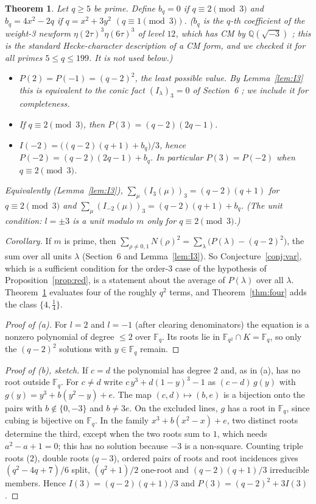 \documentclass[11pt]{article}
\newtheorem{theorem}{Theorem}
\begin{document}
\begin{theorem}\label{thm:gal}
Let $q\ge5$ be prime. Define $b_q=0$ if $q\equiv2\pmod3$ and $b_q=4x^2-2q$ if $q=x^2+3y^2$ $(q\equiv1\pmod3)$.
($b_q$ is the $q$-th coefficient of the weight-3 newform $\eta(2\tau)^3\eta(6\tau)^3$ of level $12$, which has CM by $\mathbb Q(\sqrt{-3})$ \cite{LM}; this is the standard
Hecke-character description of a CM form, and we checked it for all primes $5\le q\le199$. It is not used below.)
\begin{itemize}
\item[(a)] $P(2)=P(-1)=(q-2)^2$, the least possible value. By Lemma~\ref{lem:I3} this is equivalent to the conic fact $(I_\lambda)_3=0$ of Section~6 \cite{JV,Pi}; we include it for completeness.
\item[(b)] If $q\equiv2\pmod3$, then $P(3)=(q-2)(2q-1)$.
\item[(c)] $I(-2)=\big((q-2)(q+1)+b_q\big)/3$, hence $P(-2)=(q-2)(2q-1)+b_q$. In particular $P(3)=P(-2)$ when $q\equiv2\pmod3$.
\end{itemize}
Equivalently (Lemma~\ref{lem:I3}), $\sum_\mu(I_3(\mu))_3=(q-2)(q+1)$ for $q\equiv2\pmod3$ and $\sum_\mu(I_{-2}(\mu))_3=(q-2)(q+1)+b_q$. (The unit condition: $l=\pm3$ is a unit modulo $m$ only for $q\equiv2\pmod3$.)
\end{theorem}
\noindent\emph{Corollary.} If $m$ is prime, then $\sum_{\rho\ne0,1}N(\rho)^2=\sum_{\lambda}\bigl(P(\lambda)-(q-2)^2\bigr)$, the sum over all units $\lambda$ (Section~6 and Lemma~\ref{lem:I3}).
So Conjecture~\ref{conj:var}, which is a sufficient condition for the order-3 case of the hypothesis of Proposition~\ref{prop:red}, is a statement about the average of $P(\lambda)$ over all $\lambda$.
Theorem~\ref{thm:gal} evaluates four of the roughly $q^2$ terms, and Theorem~\ref{thm:four} adds the class $\{4,\tfrac14\}$.

\begin{proof}[Proof of (a)]
For $l=2$ and $l=-1$ (after clearing denominators) the equation is a nonzero polynomial of degree $\le2$ over $\mathbb F_q$. Its roots lie in
$\mathbb F_{q^2}\cap K=\mathbb F_q$, so only the $(q-2)^2$ solutions with $y\in\mathbb F_q$ remain.
\end{proof}

\begin{proof}[Proof of (b), sketch]
If $c=d$ the polynomial has degree $2$ and, as in (a), has no root outside $\mathbb F_q$. For $c\ne d$ write $c\,y^3+d(1-y)^3-1$ as $(c-d)\,g(y)$ with $g(y)=y^3+b(y^2-y)+e$. The map $(c,d)\mapsto(b,e)$ is a bijection onto the pairs with
$b\notin\{0,-3\}$ and $b\ne3e$. On the excluded lines, $g$ has a root in $\mathbb F_q$, since cubing is bijective on $\mathbb F_q$. In the family
$x^3+b(x^2-x)+e$, two distinct roots determine the third, except when the two roots sum to $1$, which needs $a^2-a+1=0$; this has no solution because
$-3$ is a non-square. Counting triple roots ($2$), double roots ($q-3$), ordered pairs of roots and root incidences gives
$(q^2-4q+7)/6$ split, $(q^2+1)/2$ one-root and $(q-2)(q+1)/3$ irreducible members. Hence $I(3)=(q-2)(q+1)/3$ and $P(3)=(q-2)^2+3I(3)$.
\end{proof}
\end{document}
